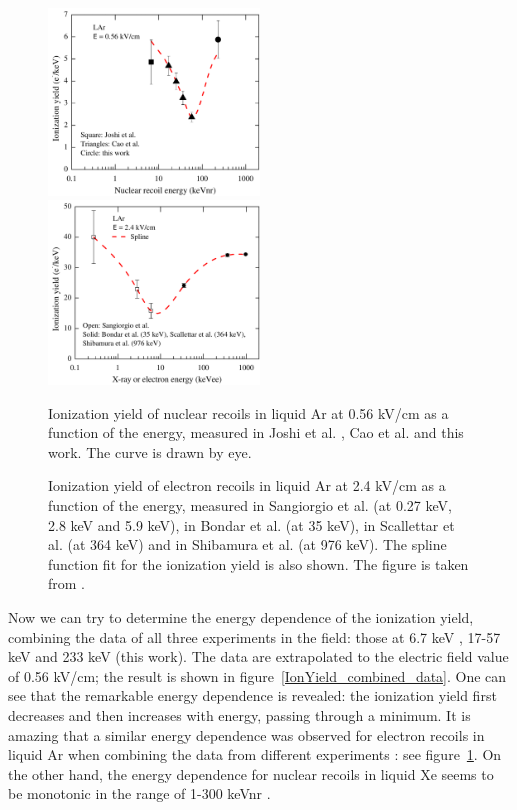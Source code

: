 \documentclass[a4paper,11pt]{article}
\begin{document}
\begin{figure}[ht!]
	\includegraphics[width=0.5\textwidth]{IonYield_combined_data}
	\hfill
	\includegraphics[width=0.5\textwidth]{IonYield_electron}
	\\
	\parbox[t]{0.47\textwidth}{\caption{Ionization yield of nuclear recoils in liquid Ar at 0.56 kV/cm
 as a function of the energy, measured in Joshi et al. \cite{Joshi}, Cao et al. \cite{Cao} and this work.
The curve is drawn by eye.}
		\label{IonYield_combined_data}}
	\hfill
	\parbox[t]{0.47\textwidth}{\caption{Ionization yield of electron recoils in liquid Ar at 2.4 kV/cm
as a function of the energy, measured in Sangiorgio et al. \cite{Sangiorgio} (at 0.27 keV, 2.8 keV and 5.9 keV), in Bondar et al. \cite{XRayYield16} (at 35 keV), in Scallettar et al. \cite{Scalettar} (at 364 keV) and in Shibamura et al. \cite{Shibamura} (at 976 keV).
  The spline function fit for the ionization yield is also shown. The figure is taken from \cite{XRayYield16}.}
		\label{IonYield_electron}}
\end{figure}
Now we can try to determine the energy dependence of the ionization yield, combining the data of all three  experiments in the field: those at 6.7 keV \cite{Joshi}, 17-57 keV \cite{Cao} and 233 keV (this work). The data are extrapolated to the electric field value of 0.56 kV/cm; the result is shown in figure~\ref{IonYield_combined_data}.  One can see that the remarkable energy dependence is revealed: the ionization yield first decreases and then increases with energy, passing through a minimum. It is amazing that a similar energy dependence was observed for electron recoils in liquid Ar when combining the data from different experiments \cite{XRayYield16}: see figure~\ref{IonYield_electron}. On the other hand, the energy dependence for nuclear recoils in liquid Xe seems to be monotonic in the range of 1-300 keVnr \cite{Lenardo}.
\end{document}
